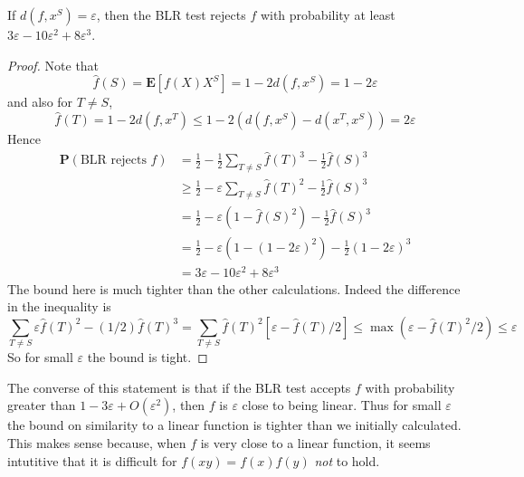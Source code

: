 \begin{theorem}
    If $d(f,x^S) = \varepsilon$, then the BLR test rejects $f$ with probability at least $3\varepsilon - 10 \varepsilon^2 + 8 \varepsilon^3$.
\end{theorem}
\begin{proof}
    Note that
    \[ \widehat{f}(S) = \mathbf{E}[f(X)X^S] = 1 - 2d(f,x^S) = 1 - 2\varepsilon \]
    and also for $T \neq S$,
    \[ \widehat{f}(T) = 1 - 2d(f,x^T) \leq 1 - 2(d(f,x^S) - d(x^T,x^S)) = 2 \varepsilon \]
    Hence
    \begin{align*}
        \mathbf{P}(\text{BLR rejects $f$}) &= \frac{1}{2} - \frac{1}{2} \sum_{T \neq S} \widehat{f}(T)^3  - \frac{1}{2} \widehat{f}(S)^3\\
        &\geq \frac{1}{2}  - \varepsilon \sum_{T \neq S} \widehat{f}(T)^2 - \frac{1}{2} \widehat{f}(S)^3\\
        &= \frac{1}{2} - \varepsilon (1 - \widehat{f}(S)^2) - \frac{1}{2} \widehat{f}(S)^3\\
        &= \frac{1}{2} - \varepsilon (1 - (1 - 2 \varepsilon)^2) - \frac{1}{2} (1 - 2\varepsilon)^3\\
        &=  3\varepsilon - 10 \varepsilon^2 + 8 \varepsilon^3
    \end{align*}
    The bound here is much tighter than the other calculations. Indeed the difference in the inequality is
    \[ \sum_{T \neq S} \varepsilon \widehat{f}(T)^2 - (1/2) \widehat{f}(T)^3 = \sum_{T \neq S} \widehat{f}(T)^2 [\varepsilon - \widehat{f}(T)/2] \leq \max(\varepsilon - \widehat{f}(T)^2/2) \leq \varepsilon \]
    So for small $\varepsilon$ the bound is tight.
\end{proof}

The converse of this statement is that if the BLR test accepts $f$ with probability greater than $1 - 3\varepsilon + O(\varepsilon^2)$, then $f$ is $\varepsilon$ close to being linear. Thus for small $\varepsilon$ the bound on similarity to a linear function is tighter than we initially calculated. This makes sense because, when $f$ is very close to a linear function, it seems intutitive that it is difficult for $f(xy) = f(x)f(y)$ {\it not} to hold.

